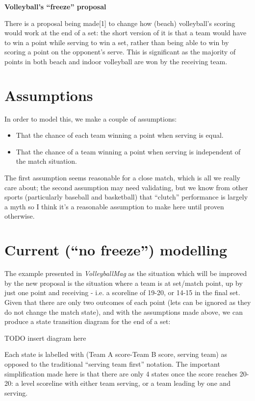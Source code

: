 \documentclass[a4paper,12pt]{article}
\begin{document}
\begin{center}
  {\LARGE \textbf{Volleyball's ``freeze'' proposal}}
\end{center}

There is a proposal being made[1] to change how (beach) volleyball's scoring
would work at the end of a set: the short version of it is that a team would
have to win a point while serving to win a set, rather than being able to win
by scoring a point on the opponent's serve. This is significant as the majority
of points in both beach and indoor volleyball are won by the receiving team.

\section{Assumptions}

In order to model this, we make a couple of assumptions:

\begin{itemize}
  \item That the chance of each team winning a point when serving is equal.
  \item That the chance of a team winning a point when serving is independent
    of the match situation.
\end{itemize}

The first assumption seems reasonable for a close match, which is all we really
care about; the second assumption may need validating, but we know from other
sports (particularly baseball and basketball) that ``clutch'' performance is
largely a myth so I think it's a reasonable assumption to make here until
proven otherwise.

\section{Current (``no freeze'') modelling}

The example presented in \textit{VolleyballMag} as the situation which will be
improved by the new proposal is the situation where a team is at set/match
point, up by just one point and receiving - i.e. a scoreline of 19-20, or 14-15
in the final set. Given that there are only two outcomes of each point (lets
can be ignored as they do not change the match state), and with the assumptions
made above, we can produce a state transition diagram for the end of a set:

TODO insert diagram here

Each state is labelled with (Team A score-Team B score, serving team) as
opposed to the traditional ``serving team first'' notation. The important
simplification made here is that there are only 4 states once the score
reaches 20-20: a level scoreline with either team serving, or a team leading by
one and serving.
\end{document}
